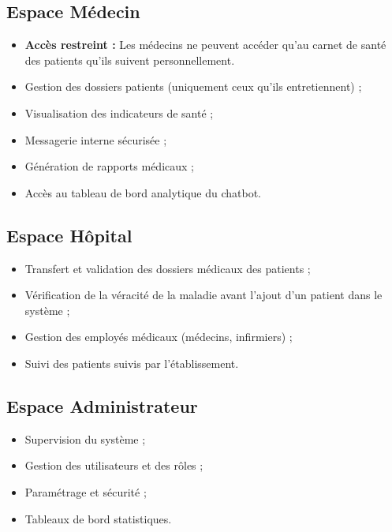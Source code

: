 ﻿\documentclass[12pt,a4paper]{report}
\begin{document}
\subsection*{Espace Médecin}  
\begin{itemize}
    \item \textbf{Accès restreint :} Les médecins ne peuvent accéder qu'au carnet de santé des patients qu'ils suivent personnellement.
    \item Gestion des dossiers patients (uniquement ceux qu'ils entretiennent) ;
    \item Visualisation des indicateurs de santé ;
    \item Messagerie interne sécurisée ;
    \item Génération de rapports médicaux ;
    \item Accès au tableau de bord analytique du chatbot.
\end{itemize}

\subsection*{Espace Hôpital}  
\begin{itemize}
    \item Transfert et validation des dossiers médicaux des patients ;
    \item Vérification de la véracité de la maladie avant l'ajout d'un patient dans le système ;
    \item Gestion des employés médicaux (médecins, infirmiers) ;
    \item Suivi des patients suivis par l'établissement.
\end{itemize}

\subsection*{Espace Administrateur}  
\begin{itemize}
    \item Supervision du système ;
    \item Gestion des utilisateurs et des rôles ;
    \item Paramétrage et sécurité ;
    \item Tableaux de bord statistiques.
\end{itemize}
\newpage
\end{document}
